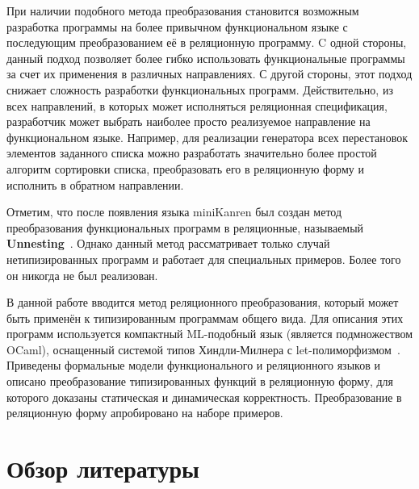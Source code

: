 При наличии подобного метода преобразования становится возможным разработка программы на более привычном функциональном языке с последующим преобразованием её в реляционную программу. C одной стороны, данный подход позволяет более гибко использовать функциональные программы за счет их применения в различных направлениях. С другой стороны, этот подход снижает сложность разработки функциональных программ. Действительно, из всех направлений, в которых может исполняться реляционная спецификация, разработчик может выбрать наиболее просто реализуемое направление на функциональном языке. Например, для реализации генератора всех перестановок элементов заданного списка можно разработать значительно более простой алгоритм сортировки списка, преобразовать его в реляционную форму и исполнить в обратном направлении.

Отметим, что после появления языка miniKanren был создан метод преобразования функциональных программ в реляционные, называемый \textbf{Unnesting}~\cite{lozov-spbu:miniKanren}. Однако данный метод рассматривает только случай нетипизированных программ и работает для специальных примеров. Более того он никогда не был реализован.

В данной работе вводится метод реляционного преобразования, который может быть применён к типизированным программам общего вида. Для описания этих программ используется компактный ML-подобный язык (является подмножеством OCaml), оснащенный системой типов Хиндли-Милнера с let-полиморфизмом~\cite{lozov-spbu:poly}. Приведены формальные модели функционального и реляционного языков и описано преобразование типизированных функций в реляционную форму, для которого доказаны статическая и динамическая корректность. Преобразование в реляционную форму апробировано на наборе примеров.

\section{Обзор литературы}

